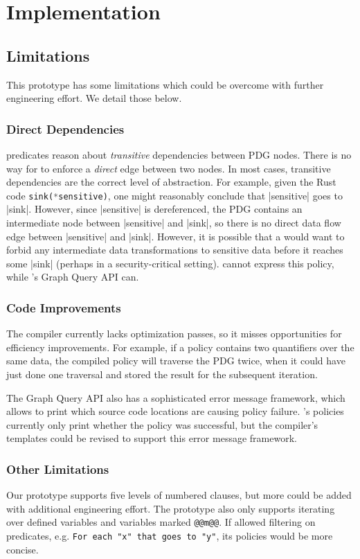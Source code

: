 \chapter{Implementation}



\section{Limitations}
This prototype has some limitations which could be overcome with further engineering effort.
%
We detail those below.

\subsection{Direct Dependencies}
\label{sec:direct-limits}
\syslang{} predicates reason about \emph{transitive} dependencies between PDG nodes.
%
There is no way for \ces{} to enforce a \emph{direct} edge between two nodes.
%
In most cases, transitive dependencies are the correct level of abstraction.
%
For example, given the Rust code \lstinline[language=Rust]|sink(*sensitive)|,
one might reasonably conclude that |sensitive| goes to |sink|.
%
However, since |sensitive| is dereferenced, the PDG contains an intermediate node between |sensitive| and |sink|,
so there is no direct data flow edge between |sensitive| and |sink|.
%
However, it is possible that a \dev{} would want to forbid any intermediate data transformations
to sensitive data before it reaches some |sink| (perhaps in a security-critical setting).
%
\syslang{} cannot express this policy, while \sys{}'s Graph Query API can.

\subsection{Code Improvements}
\label{sec:code-limits}
The \syslang{} compiler currently lacks optimization passes, so it misses opportunities for efficiency improvements.
%
For example, if a policy contains two quantifiers over the same data, the \syslang{} compiled policy will traverse the PDG twice,
when it could have just done one traversal and stored the result for the subsequent iteration.

The Graph Query API also has a sophisticated error message framework,
which allows \devs{} to print which source code locations are causing policy failure.
%
\syslang{}'s policies currently only print whether the policy was successful,
but the compiler's templates could be revised to support this error message framework.
%

\subsection{Other Limitations}
\label{sec:other-limits}
Our \syslang{} prototype supports five levels of numbered clauses, but more could be added with additional engineering effort.
%
The prototype also only supports iterating over defined variables and variables marked \lstinline[language=CNL]|@@m@@|.
%
If \syslang{} allowed filtering on predicates, e.g. \lstinline[language=CNL]|For each "x" that goes to "y"|,
its policies would be more concise.
